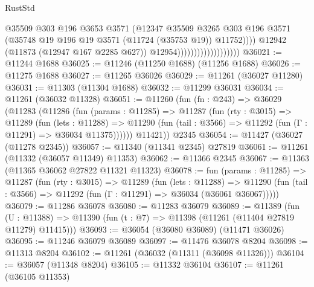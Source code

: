 \begin{lexlean}{RustStd}
\begin{coremodule}
                                              @35509
                                              @303
                                              @196
                                              @3653
                                              @3571
                                              (@12347
                                                @35509
                                                @3265
                                                @303
                                                @196
                                                @3571
                                                (@35748
                                                  @19
                                                  @196
                                                  @19
                                                  @3571
                                                  (@11724 (@35753 @19))
                                                  @11752))))
                                          @12942
                                          (@11873 (@12947 @167 @2285 @627))
                                          @12954)))))))))))))))))))
@36021 := @11244 @1688
@36025 := @11246 (@11250 @1688) (@11256 @1688)
@36026 := @11275 @1688
@36027 := @11265 @36026
@36029 := @11261 (@36027 @11280)
@36031 := @11303 (@11304 @1688)
@36032 := @11299 @36031
@36034 := @11261 (@36032 @11328)
@36051 := @11260
    (fun (fn : @243) =>
    @36029
      (@11283
        (@11286
          (fun (params : @11285) =>
          @11287
            (fun (rty : @3015) =>
            @11289
              (fun (lets : @11288) =>
              @11290 (fun (tail : @3566) => @11292 (fun (Γ : @11291) => @36034 @11375))))))
        @11421))
    @2345
@36054 := @11427 (@36027 (@11278 @2345))
@36057 := @11340 (@11341 @2345) @27819
@36061 := @11261 (@11332 (@36057 @11349) @11353)
@36062 := @11366 @2345
@36067 := @11363 (@11365 @36062 @27822 @11321 @11323)
@36078 := fun (params : @11285) =>
  @11287
    (fun (rty : @3015) =>
    @11289
      (fun (lets : @11288) =>
      @11290 (fun (tail : @3566) => @11292 (fun (Γ : @11291) => @36034 (@36061 @36067)))))
@36079 := @11286 @36078
@36080 := @11283 @36079
@36089 := @11389
    (fun (U : @11388) => @11390 (fun (t : @7) => @11398 (@11261 (@11404 @27819 @11279) @11415)))
@36093 := @36054 (@36080 @36089) (@11471 @36026)
@36095 := @11246 @36079 @36089
@36097 := @11476 @36078 @8204
@36098 := @11313 @8204
@36102 := @11261 (@36032 (@11311 (@36098 @11326)))
@36104 := @36057 (@11348 @8204)
@36105 := @11332 @36104
@36107 := @11261 (@36105 @11353)

\end{coremodule}
\end{lexlean}
